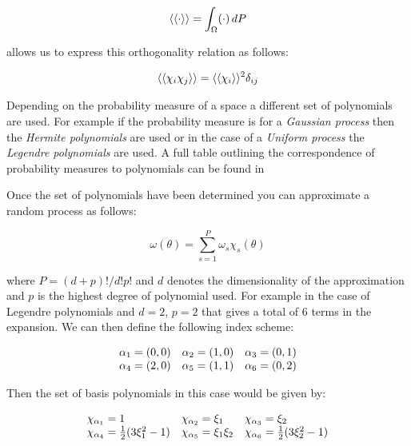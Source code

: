 \begin{equation}\label{eq:oned-stochastic-expect-notation}
    \left\langle\langle\cdot\right\rangle\rangle = \int_{\Omega}(\cdot) \,dP
\end{equation}

allows us to express this orthogonality relation as follows:

\begin{equation}\label{oned-stochastic-orthog-relation}
    \left\langle\langle\chi_i\chi_j\right\rangle\rangle = \left\langle\langle\chi_i\right\rangle\rangle^2\delta_{ij}
\end{equation}

Depending on the probability measure of a space a different set of polynomials
are used. For example if the probability measure is for a
\textit{Gaussian process} then the \textit{Hermite polynomials} are used or in
the case of a \textit{Uniform process} the \textit{Legendre polynomials} are
used. A full table outlining the correspondence of probability measures to
polynomials can be found in \cite{general-poly-chaos}

Once the set of polynomials have been determined you can approximate a random
process as follows:

\begin{equation}
    \omega(\theta) = \sum_{s=1}^P\omega_s\chi_s(\theta)
\end{equation}

where $P = (d + p)!/d!p!$ and $d$ denotes the dimensionality of the
approximation and $p$ is the highest degree of polynomial used. For example in
the case of Legendre polynomials and $d=2$, $p=2$ that gives a total of 6
terms in the expansion. We can then define the following index scheme:

\begin{equation}
  \begin{array}{c c c }
    \alpha_1 = (0,0) & \alpha_2 = (1,0) & \alpha_3 = (0,1) \\
    \alpha_4 = (2,0) & \alpha_5 = (1,1) & \alpha_6 = (0,2)
  \end{array}
\end{equation}

Then the set of basis polynomials in this case would be given by:

\begin{equation}
  \begin{array}{l l l}
    \chi_{\alpha_1} = 1 & \chi_{\alpha_2} = \xi_1 & \chi_{\alpha_3} = \xi_2 \\
    \chi_{\alpha_4} = \frac{1}{2}(3\xi_1^2 - 1) &
    \chi_{\alpha_5} = \xi_1\xi_2 &
    \chi_{\alpha_6} = \frac{1}{2}(3\xi_2^2 - 1)
  \end{array}
\end{equation}

